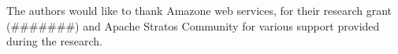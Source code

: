 The authors would like to thank Amazone web services, for their research grant (#######) and Apache Stratos Community for various support provided during the research.




